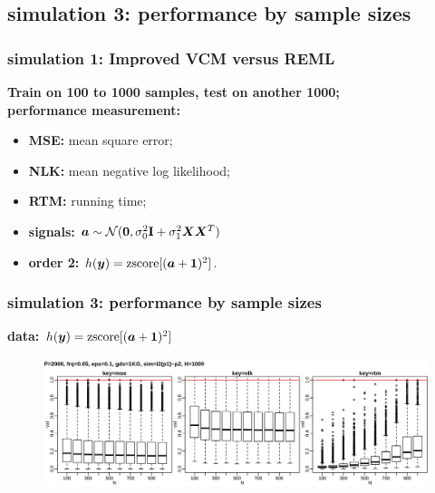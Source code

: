 \documentclass{beamer}
\begin{document}
\subsection{simulation 3: performance by sample sizes}
\begin{frame}\frametitle{simulation 1: Improved VCM versus REML}
  \textbf{Train on 100 to 1000 samples, test on another 1000;} \\
  {\color{blue}\textbf{performance measurement:}}
  \begin{itemize}
  \item \textbf{MSE:} mean square error;
  \item \textbf{NLK:} mean negative log likelihood;
  \item \textbf{RTM:} running time;
  \end{itemize}
  \begin{itemize}
  \item \textbf{signals:} ${\bm{a}} \sim \mathcal{N}(\bm{0}, \sigma_0^2\textbf{I} + \sigma_1^2{\bm{X}}{\bm{X}}^T)$
  \item \textbf{order 2:} $h({\bm{y}})=\text{zscore}[({\bm{a}} + \mathbf{1})^2]$.
  \end{itemize}
\end{frame}
\begin{frame}\frametitle{simulation 3: performance by sample sizes}
  \textbf{data: $h({\bm{y}})=\text{zscore}[({\bm{a}} + \mathbf{1})^2]$} \\
  \begin{figure}
    \centering \includegraphics[width=.95\linewidth]{img/1kg_whl_t02}
  \end{figure}
  \textbf{\color{blue}{inner plot: sample sizes}}
\end{frame}
\end{document}
